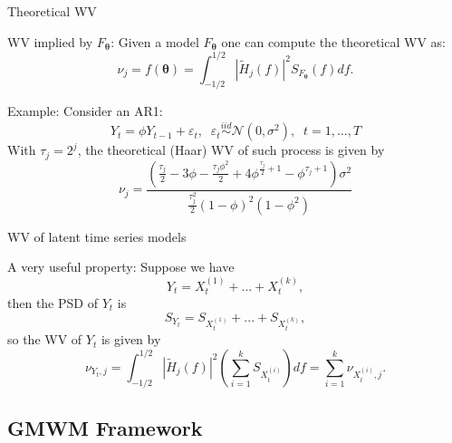 \documentclass[envcountsect,usenames,dvipsnames]{beamer}
\theoremstyle{mystyle}
\begin{document}
\begin{frame}{Theoretical WV}
	\begin{block}{WV implied by $F_{\bm{\theta}}$:}
		\small
		Given a model $F_{\bm{\theta}}$ one can compute the theoretical WV as: 
		\begin{equation*}
				 \nu_{j} = f\left( \bm{\theta} \right) = \int_{-1/2}^{1/2} |{\widetilde H}_j(f)|^2 S_{F_{\bm\theta}}(f) df.
		\end{equation*}
	\end{block} 
	
	\begin{exampleblock}{Example:}
		\small
		Consider an AR1:
		\vspace{-0.1cm}
		\[ 
						Y_t = \phi Y_{t-1} + \varepsilon_t, \;\; \varepsilon_t \overset{iid}{\sim}  \mathcal{N}\left( 0 , \sigma^2 \right), \;\;  t = 1, ... , T
				\]
		\vspace{-0.1cm}
		With $\tau_j = 2^j$, the theoretical (Haar) WV of such process is given by
		\vspace{-0.1cm}
		\[ 
		  \nu_{j} =\frac{\left( \frac{\tau_j}{2} - 3 \phi - \frac{\tau_j \phi^2}{2} + 4\phi^{\frac{\tau_j}{2} + 1} - \phi^{\tau_j + 1} \right) \sigma^2}{\frac{\tau_j^2}{2} \left(1 - \phi \right)^2 \left(1 - \phi^2 \right)}
				\]
		\vspace{-0.1cm}
	\end{exampleblock}
\end{frame}


\begin{frame}{WV of latent time series models}
	\begin{block}{A very useful property:}
		Suppose we have
		\begin{equation*}
			Y_t = X_t^{(1)} + ... + X_t^{(k)},
		\end{equation*}
		then the PSD of $Y_t$ is
		\begin{equation*}
			S_{Y_t} = S_{X_t^{(1)}} + ... + S_{X_t^{(k)}},
		\end{equation*}
		so the WV of $Y_t$ is given by
		\begin{equation*}
			\nu_{Y_t, j} = \int_{-1/2}^{1/2} |{\widetilde H}_j(f)|^2 \left(\sum_{i = 1}^{k} S_{X_t^{(i)}} \right) df = \sum_{i = 1}^{k} \nu_{X_t^{(i)}, j}.
		\end{equation*}
	\end{block}
\end{frame}

\subsection{GMWM Framework}
\end{document}
